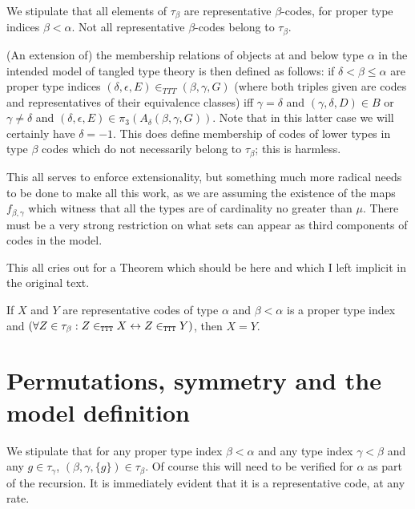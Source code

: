 \begin{lemma}
\label {objects-are-representative}
We stipulate that all elements of $\tau_\beta$ are representative $\beta$-codes, for proper type indices $\beta<\alpha$.
Not all representative $\beta$-codes belong to $\tau_\beta$.
\end{lemma}

\begin{definition}
\label {def:ttt-membership}
(An extension of) the membership relations of objects at and below type $\alpha$ in the intended model of tangled type theory is then defined as follows: if $\delta < \beta \leq \alpha$ are proper type indices  $(\delta,\epsilon,E) \in_{TTT} (\beta,\gamma,G)$ (where both triples given are codes and representatives of their equivalence classes) iff $\gamma=\delta$ and $(\gamma,\delta,D)  \in B$ or $\gamma\neq \delta$ and $(\delta,\epsilon,E) \in \pi_3(A_\delta(\beta,\gamma,G))$.  Note that in this latter case we will certainly have $\delta=-1$.  This does define membership of codes of lower types in type $\beta$ codes which do not necessarily belong to $\tau_\beta$;  this is harmless.
\end{definition}

This all serves to enforce extensionality, but something much more radical needs to be done to make all this work, as we are assuming the existence of the maps $f_{\beta,\gamma}$ which witness that all the types are of cardinality no greater than $\mu$.  There must be a very strong restriction on what sets can appear as third components of codes in the model.

This all cries out for a Theorem which should be here and which I left implicit in the original text.

\begin{theorem}
\label {thm:extensionality}
If $X$ and $Y$ are representative codes of type $\alpha$ and $\beta<\alpha$ is a proper type index
and $(\forall Z \in \tau_\beta:Z \in_{\tt TTT} X \leftrightarrow Z \in_{\tt TTT} Y)$, then $X=Y$.
\end{theorem}

\section{Permutations, symmetry and the model definition}

\begin{lemma}
\label {lem:singletons}
We stipulate that for any proper type index $\beta<\alpha$ and any type index $\gamma<\beta$ and any $g \in \tau_\gamma$, $(\beta,\gamma,\{g\})\in \tau_\beta$.  Of course this will need to be verified for $\alpha$ as part of the recursion.  It is immediately evident that it is a representative code, at any rate.
\end{lemma}

